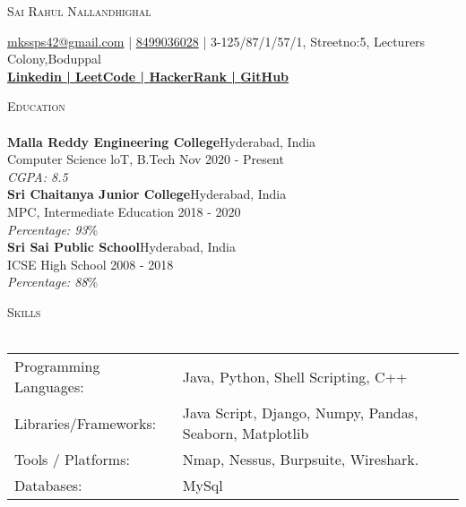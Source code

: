 \documentclass[a4paper]{article}
\newcommand{\lineunder} {
    \vspace*{-8pt} \\
    \hspace*{-18pt} \hrulefill \\
}
\newcommand{\header} [1] {
    {\hspace*{-18pt}\vspace*{6pt} \textsc{#1}}
    \vspace*{-6pt} \lineunder
}
\begin{document}
    \vspace*{-40pt}

    

%
%
  \vspace*{-2pt}
  \begin{center}
    {\Huge \scshape {Sai Rahul Nallandhighal}}\\
    \vspace*{2pt}
    
    \vspace*{2pt}
    \href{mailto:mkssps42@gmail.com}{mkssps42@gmail.com} | \href{tel:8499036028}{8499036028} | 3-125/87/1/57/1, Streetno:5, Lecturers Colony,Boduppal\\
    \vspace*{2pt}
    \textbf{\href{https://www.linkedin.com/in/sai-rahul-nallandhighal/}{Linkedin | }}\textbf{\href{https://leetcode.com/mkssps42/}{LeetCode | }}\textbf{\href{https://www.hackerrank.com/mkssps42}{HackerRank | }}\textbf{\href{https://github.com/KOAwesome}{GitHub}}\\
  \end{center}



      \header{Education}
      \vspace{2mm}
      \textbf{Malla Reddy Engineering College}\hfill Hyderabad, India\\
Computer Science loT, B.Tech \hfill Nov 2020 - Present\\
{\sl CGPA: 8.5}\\
\vspace{2mm}
      \textbf{Sri Chaitanya Junior College}\hfill Hyderabad, India\\
MPC, Intermediate Education \hfill 2018 - 2020\\
{\sl Percentage: 93}\%\\
\vspace{2mm}
      \textbf{Sri Sai Public School}\hfill Hyderabad, India\\
ICSE High School \hfill 2008 - 2018\\
{\sl Percentage: 88}\%\\
\vspace{2mm}



%
%
  \header{Skills}
  \vspace{2mm}
  \begin{longtable}{p{4cm}p{12cm}}
  Programming Languages: & Java, Python, Shell Scripting, C++ \\
  Libraries/Frameworks: & Java Script, Django, Numpy, Pandas, Seaborn, Matplotlib \\
  Tools / Platforms: & Nmap, Nessus, Burpsuite, Wireshark. \\
  Databases: & MySql \\
  \end{longtable}
  \vspace{1mm}
\end{document}
